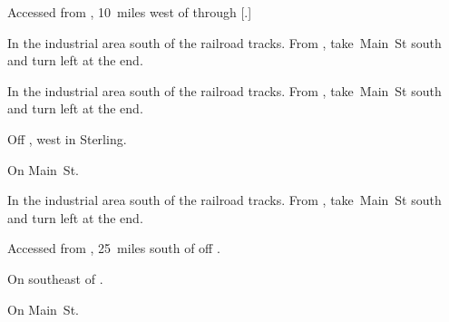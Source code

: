 
\begin{LocationList}

Accessed from , 10~miles west of  through [.]

In the industrial area south of the railroad tracks.
From , take~Main~St south and turn left at the end.

\Location{\GarageHQ \Garage}
In the industrial area south of the railroad tracks.
From , take~Main~St south and turn left at the end.

Off , west in Sterling.

On  Main~St.

In the industrial area south of the railroad tracks.
From , take~Main~St south and turn left at the end.

Accessed from , 25~miles south of  off  .

\Location{\TruckStop \Gas \Rest \Weigh}
On  southeast of  .

On  Main~St.

\end{LocationList}

